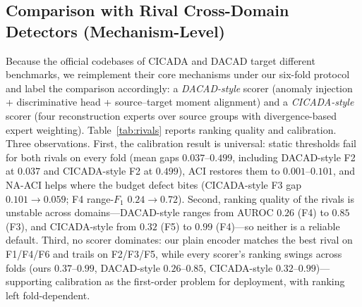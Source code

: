 \subsection{Comparison with Rival Cross-Domain Detectors (Mechanism-Level)}
\label{sec:rivals}
Because the official codebases of CICADA \cite{cicada2025} and DACAD \cite{dacad2024} target different benchmarks, we reimplement their core mechanisms under our six-fold protocol and label the comparison accordingly: a \emph{DACAD-style} scorer (anomaly injection + discriminative head + source--target moment alignment) and a \emph{CICADA-style} scorer (four reconstruction experts over source groups with divergence-based expert weighting). Table~\ref{tab:rivals} reports ranking quality and calibration. Three observations. First, the calibration result is universal: static thresholds fail for both rivals on every fold (mean gaps $0.037$--$0.499$, including DACAD-style F2 at $0.037$ and CICADA-style F2 at $0.499$), ACI restores them to $0.001$--$0.101$, and NA-ACI helps where the budget defect bites (CICADA-style F3 gap $0.101\!\to\!0.059$; F4 range-$F_1$ $0.24\!\to\!0.72$). Second, ranking quality of the rivals is unstable across domains---DACAD-style ranges from AUROC $0.26$ (F4) to $0.85$ (F3), and CICADA-style from $0.32$ (F5) to $0.99$ (F4)---so neither is a reliable default. Third, no scorer dominates: our plain encoder matches the best rival on F1/F4/F6 and trails on F2/F3/F5, while every scorer's ranking swings across folds (ours $0.37$--$0.99$, DACAD-style $0.26$--$0.85$, CICADA-style $0.32$--$0.99$)---supporting calibration as the first-order problem for deployment, with ranking left fold-dependent.

\begin{table}[t]
\caption{Mechanism-level rival comparison (6 folds). AUROC per scorer; mean coverage gap static\,$\to$\,ACI; range-$F_1$ (mean over levels) for ACI and NA-ACI. Static fails for both rivals; ACI restores; rival rankings are unstable across folds. Best per-row AUROC in bold.}
\label{tab:rivals}
\centering
\small
{}
\end{table}

